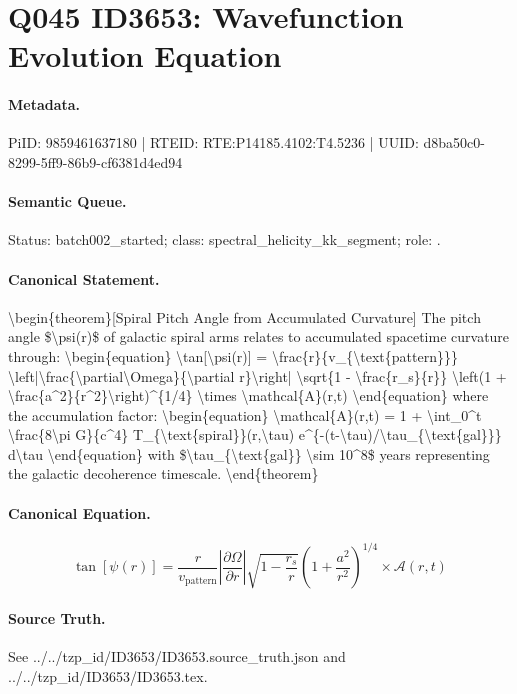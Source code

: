 \section*{Q045 ID3653: Wavefunction Evolution Equation}
\paragraph{Metadata.}
PiID: 9859461637180 | RTEID: RTE:P14185.4102:T4.5236 | UUID: d8ba50c0-8299-5ff9-86b9-cf6381d4ed94

\paragraph{Semantic Queue.}
Status: batch002\_started; class: spectral\_helicity\_kk\_segment; role: .

\paragraph{Canonical Statement.}
\textbackslash{}begin\{theorem\}[Spiral Pitch Angle from Accumulated Curvature] The pitch angle \$\textbackslash{}psi(r)\$ of galactic spiral arms relates to accumulated spacetime curvature through: \textbackslash{}begin\{equation\} \textbackslash{}tan[\textbackslash{}psi(r)] = \textbackslash{}frac\{r\}\{v\_\{\textbackslash{}text\{pattern\}\}\} \textbackslash{}left|\textbackslash{}frac\{\textbackslash{}partial\textbackslash{}Omega\}\{\textbackslash{}partial r\}\textbackslash{}right| \textbackslash{}sqrt\{1 - \textbackslash{}frac\{r\_s\}\{r\}\} \textbackslash{}left(1 + \textbackslash{}frac\{a\textasciicircum{}2\}\{r\textasciicircum{}2\}\textbackslash{}right)\textasciicircum{}\{1/4\} \textbackslash{}times \textbackslash{}mathcal\{A\}(r,t) \textbackslash{}end\{equation\} where the accumulation factor: \textbackslash{}begin\{equation\} \textbackslash{}mathcal\{A\}(r,t) = 1 + \textbackslash{}int\_0\textasciicircum{}t \textbackslash{}frac\{8\textbackslash{}pi G\}\{c\textasciicircum{}4\} T\_\{\textbackslash{}text\{spiral\}\}(r,\textbackslash{}tau) e\textasciicircum{}\{-(t-\textbackslash{}tau)/\textbackslash{}tau\_\{\textbackslash{}text\{gal\}\}\} d\textbackslash{}tau \textbackslash{}end\{equation\} with \$\textbackslash{}tau\_\{\textbackslash{}text\{gal\}\} \textbackslash{}sim 10\textasciicircum{}8\$ years representing the galactic decoherence timescale. \textbackslash{}end\{theorem\}

\paragraph{Canonical Equation.}
\[
\begin{equation} \tan[\psi(r)] = \frac{r}{v_{\text{pattern}}} \left|\frac{\partial\Omega}{\partial r}\right| \sqrt{1 - \frac{r_s}{r}} \left(1 + \frac{a^2}{r^2}\right)^{1/4} \times \mathcal{A}(r,t) \end{equation}
\]

\paragraph{Source Truth.}
See ../../tzp\_id/ID3653/ID3653.source\_truth.json and ../../tzp\_id/ID3653/ID3653.tex.
